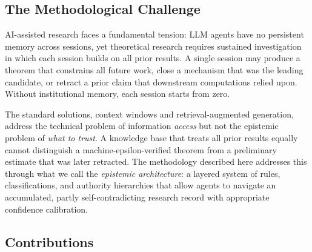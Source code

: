 \documentclass[12pt,a4paper]{article}
\begin{document}
\subsection{The Methodological Challenge}

AI-assisted research faces a fundamental tension: LLM agents have no persistent memory across sessions, yet theoretical research requires sustained investigation in which each session builds on all prior results. A single session may produce a theorem that constrains all future work, close a mechanism that was the leading candidate, or retract a prior claim that downstream computations relied upon. Without institutional memory, each session starts from zero.

The standard solutions, context windows and retrieval-augmented generation, address the technical problem of information \emph{access} but not the epistemic problem of \emph{what to trust}. A knowledge base that treats all prior results equally cannot distinguish a machine-epsilon-verified theorem from a preliminary estimate that was later retracted. The methodology described here addresses this through what we call the \emph{epistemic architecture}: a layered system of rules, classifications, and authority hierarchies that allow agents to navigate an accumulated, partly self-contradicting research record with appropriate confidence calibration.

\subsection{Contributions}
\end{document}
